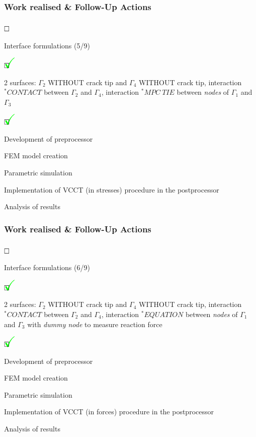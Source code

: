 \documentclass[first,firstsupp,lastsupp,handout,last,hyperref,table]{ETHclass}
\begin{document}
\begin{frame}
\frametitle{Work realised \& Follow-Up Actions}
\vspace{-0.5cm}
\scriptsize
\begin{list}{$\text{\rlap{\textcolor{white}{\huge$\mathbf{\checkmark}$}}}\square$}{}  
\item Interface formulations (5/9)
\begin{list}{$\text{\rlap{\textcolor{green}{\huge$\mathbf{\checkmark}$}}}\square$}{}  
\item  2 surfaces: $\Gamma_{2}$ WITHOUT crack tip and $\Gamma_{4}$ WITHOUT crack tip, interaction $^{*}CONTACT$ between  $\Gamma_{2}$ and $\Gamma_{4}$, interaction $^{*}MPC\ TIE$ between \textit{nodes} of $\Gamma_{1}$ and $\Gamma_{3}$
\begin{list}{$\text{\rlap{\textcolor{green}{\huge$\mathbf{\checkmark}$}}}\square$}{}
\item Development of preprocessor
\item FEM model creation
\item Parametric simulation
\item Implementation of VCCT (in stresses) procedure in the postprocessor
\item Analysis of results
\end{list}
\end{list}
\end{list}
\end{frame}

\begin{frame}
\frametitle{Work realised \& Follow-Up Actions}
\vspace{-0.5cm}
\scriptsize
\begin{list}{$\text{\rlap{\textcolor{white}{\huge$\mathbf{\checkmark}$}}}\square$}{}  
\item Interface formulations (6/9)
\begin{list}{$\text{\rlap{\textcolor{green}{\huge$\mathbf{\checkmark}$}}}\square$}{}  
\item  2 surfaces: $\Gamma_{2}$ WITHOUT crack tip and $\Gamma_{4}$ WITHOUT crack tip, interaction $^{*}CONTACT$ between  $\Gamma_{2}$ and $\Gamma_{4}$, interaction $^{*}EQUATION$ between \textit{nodes} of $\Gamma_{1}$ and $\Gamma_{3}$ with \textit{dummy node} to measure reaction force
\begin{list}{$\text{\rlap{\textcolor{green}{\huge$\mathbf{\checkmark}$}}}\square$}{}  
\item Development of preprocessor
\item FEM model creation
\item Parametric simulation
\item Implementation of VCCT (in forces) procedure in the postprocessor
\item Analysis of results
\end{list}
\end{list}
\end{list}
\end{frame}
\end{document}
